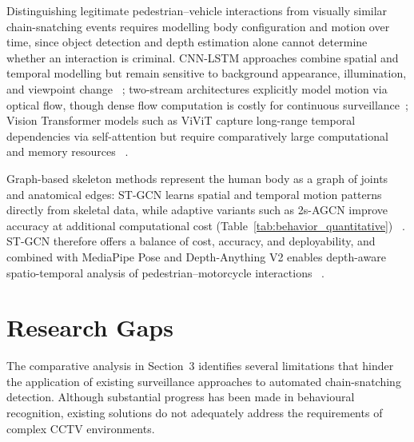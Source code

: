 \documentclass[runningheads]{llncs}
\begin{document}
Distinguishing legitimate pedestrian--vehicle interactions from
visually similar chain-snatching events requires modelling body
configuration and motion over time, since object detection and depth
estimation alone cannot determine whether an interaction is criminal.
CNN-LSTM approaches combine spatial and temporal modelling but remain
sensitive to background appearance, illumination, and viewpoint change
~\cite{cnnlstm}; two-stream architectures explicitly model motion via
optical flow, though dense flow computation is costly for continuous
surveillance~\cite{twostreamlstm}; Vision Transformer models such as
ViViT capture long-range temporal dependencies via self-attention but
require comparatively large computational and memory resources
~\cite{liu2022video}.

Graph-based skeleton methods represent the human body as a graph of
joints and anatomical edges: ST-GCN learns spatial and temporal motion
patterns directly from skeletal data, while adaptive variants such as
2s-AGCN improve accuracy at additional computational cost
(Table~\ref{tab:behavior_quantitative})
~\cite{shi2019twostreamagcn,yan2018stgcn}. ST-GCN therefore offers a
balance of cost, accuracy, and deployability, and combined with
MediaPipe Pose and Depth-Anything V2 enables depth-aware
spatio-temporal analysis of pedestrian--motorcycle interactions
~\cite{yan2018stgcn}.

\section{Research Gaps}
\label{sec:gaps}
The comparative analysis in Section~3 identifies several limitations
that hinder the application of existing surveillance approaches to
automated chain-snatching detection. Although substantial progress has
been made in behavioural recognition, existing solutions do not
adequately address the requirements of complex CCTV environments.
\end{document}
